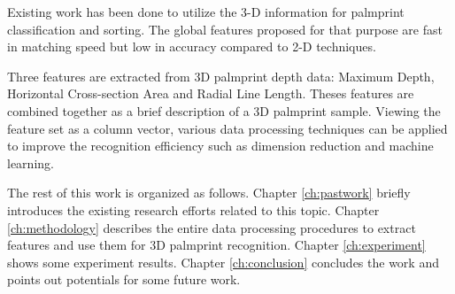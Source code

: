 Existing work has been done to utilize the 3-D information for palmprint classification and sorting. The global features proposed for that purpose are fast in matching speed but low in accuracy compared to 2-D techniques.

Three features are extracted from 3D palmprint depth data: Maximum Depth, Horizontal Cross-section Area and Radial Line Length. Theses features are combined together as a brief description of a 3D palmprint sample. Viewing the feature set as a column vector, various data processing techniques can be applied to improve the recognition efficiency such as dimension reduction and machine learning.

The rest of this work is organized as follows. Chapter \ref{ch:pastwork} briefly introduces the existing research efforts related to this topic. Chapter \ref{ch:methodology} describes the entire data processing procedures to extract features and use them for 3D palmprint recognition. Chapter \ref{ch:experiment} shows some experiment results. Chapter \ref{ch:conclusion} concludes the work and points out potentials for some future work.
